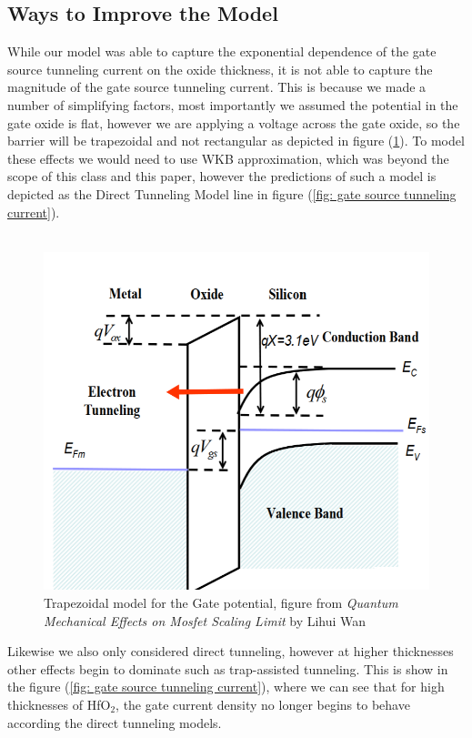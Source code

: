 \documentclass[
  reprint,
  amsmath,amssymb,
  aps
]{revtex4-1}
\begin{document}
\subsection{\label{sec:level2}Ways to Improve the Model}
While our model was able to capture the exponential dependence of the gate source tunneling current on the oxide thickness, it 
is not able to capture the magnitude of the gate source tunneling current. This is because we made a number of simplifying factors, 
most importantly we assumed the potential in the gate oxide is flat, however we are applying a voltage across the gate oxide, so the barrier 
will be trapezoidal and not rectangular as depicted in figure (\ref{fig: trapezoidal barrier}). To model these 
effects we would need to use WKB approximation, which was beyond the scope of this class and this paper, however the predictions of 
such a model is depicted as the Direct Tunneling Model line in figure (\ref{fig: gate source tunneling current}).\\\\
\begin{figure}
    \centering
    \includegraphics*[width=0.75\linewidth]{gate_potential_WKB.png}
    \caption{Trapezoidal model for the Gate potential, figure from \textit{Quantum Mechanical
    Effects on Mosfet Scaling Limit} by Lihui Wan \cite{Wan}}
    \label{fig: trapezoidal barrier}
\end{figure}
Likewise we also only considered direct tunneling, however at higher thicknesses other effects begin to dominate 
such as trap-assisted tunneling. This is show in the figure (\ref{fig: gate source tunneling current}), where we can see that 
for high thicknesses of HfO$_2$, the gate current density no longer begins to behave according the direct tunneling models.\cite{Yeo}
\end{document}
